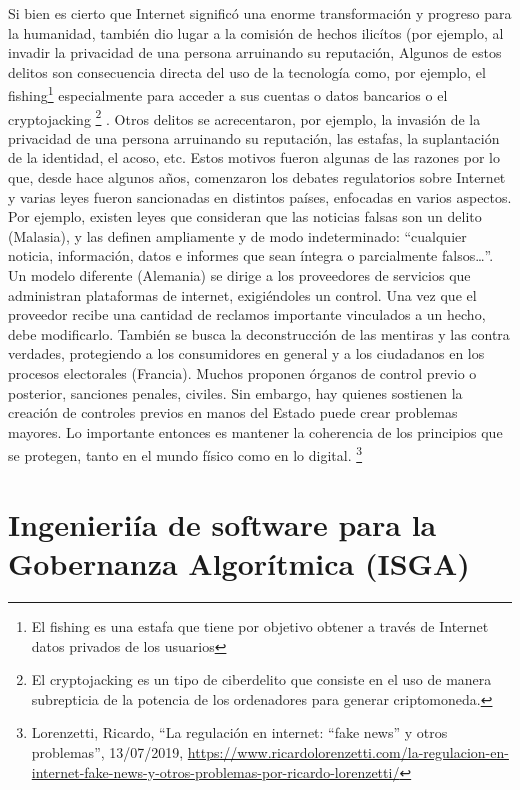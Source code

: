 \documentclass[12pt]{report} %
\begin{document}
Si bien es cierto que Internet significó una enorme transformación y progreso para la humanidad, también dio lugar a la comisión de hechos ilicítos (por ejemplo, al invadir la privacidad de una persona arruinando su reputación, Algunos de estos delitos son consecuencia directa del uso de la tecnología como, 
por ejemplo, el fishing\footnote{El fishing es una estafa que tiene por objetivo obtener a través de Internet datos privados de los usuarios}
especialmente para acceder a sus cuentas o datos bancarios
o el cryptojacking \footnote{El cryptojacking es un tipo de ciberdelito que consiste en el uso de manera subrepticia de la potencia de los ordenadores para generar criptomoneda.} . Otros delitos se acrecentaron, por ejemplo, la invasión de la privacidad de una persona arruinando su reputación, las estafas, la suplantación de la identidad, el acoso, etc.  Estos motivos fueron algunas de las razones por lo que, desde hace algunos años, comenzaron los debates regulatorios sobre Internet y varias leyes fueron sancionadas en distintos países, enfocadas en varios aspectos. Por ejemplo, existen leyes que consideran que las noticias falsas son un delito (Malasia), y las definen ampliamente y de modo indeterminado: “cualquier noticia, información, datos e informes que sean íntegra o parcialmente falsos…”. Un modelo diferente (Alemania) se dirige a los proveedores de servicios que administran plataformas de internet, exigiéndoles un control. Una vez que el proveedor recibe una cantidad de reclamos importante vinculados a un hecho, debe modificarlo. También se busca la deconstrucción de las mentiras y las contra verdades, protegiendo a los consumidores en general y a los ciudadanos en los procesos electorales (Francia). Muchos proponen órganos de control previo o posterior, sanciones penales, civiles. Sin embargo, hay quienes sostienen la creación de controles previos en manos del Estado puede crear problemas mayores. Lo importante entonces es mantener la coherencia de los principios que se protegen, tanto en el mundo físico como en lo digital. \footnote{Lorenzetti, Ricardo, “La regulación en internet: “fake news” y otros problemas”, 13/07/2019, \url{https://www.ricardolorenzetti.com/la-regulacion-en-internet-fake-news-y-otros-problemas-por-ricardo-lorenzetti/}}

           


\chapter{Ingenieriía de software para la Gobernanza Algorítmica (ISGA)}
\label{ngenieriía de software para la Gobernanza Algorítmica (ISGA)}
\end{document}
